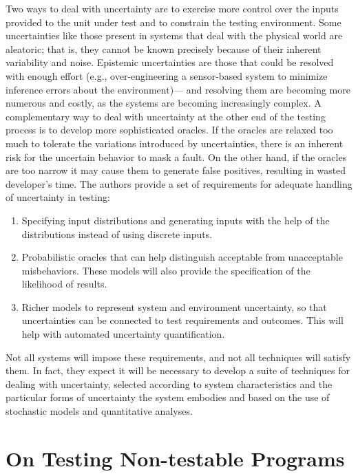 Two ways to deal with uncertainty are to exercise more control over the inputs provided to the unit under test and to constrain the testing environment. Some uncertainties like those present in systems that deal with the physical world are aleatoric; that is, they cannot be known precisely because of their inherent variability and noise.  Epistemic uncertainties are those that could be resolved with enough effort (e.g., over-engineering a sensor-based system to minimize inference errors about the environment)— and resolving them are becoming more numerous and costly, as the systems are becoming increasingly complex. A complementary way to deal with uncertainty at the other end of the testing process is to develop more sophisticated oracles. If the oracles are relaxed too much to tolerate the variations introduced by uncertainties, there is an inherent risk for the uncertain behavior to mask a fault. On the other hand, if the oracles are too narrow it may cause them to generate false positives, resulting in wasted developer's time. The authors provide a set of requirements for adequate handling of uncertainty in testing:
\begin{enumerate}
  \item Specifying input distributions and generating inputs with the help of the distributions instead of using discrete inputs.
  \item Probabilistic oracles that can help distinguish acceptable from unacceptable misbehaviors. These models will also provide the specification of the likelihood of results.
  \item Richer models to represent system and environment uncertainty, so that uncertainties can be connected to test requirements and outcomes. This will help with automated uncertainty quantification.
\end{enumerate}
Not all systems will impose these requirements, and not all techniques will satisfy them. In fact, they expect it will be necessary to develop a suite of techniques for dealing with uncertainty, selected according to system characteristics and the particular forms of uncertainty the system embodies and based on the use of stochastic models and quantitative analyses.

\section{On Testing Non-testable Programs \cite{Weyuker}}


